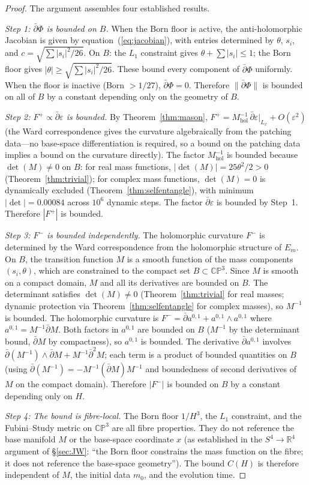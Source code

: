 \documentclass[11pt,a4paper]{article}
\theoremstyle{definition}
\theoremstyle{remark}
\newcommand{\CP}{\mathbb{CP}}
\newcommand{\R}{\mathbb{R}}
\newcommand{\dbar}{\bar{\partial}}
\begin{document}
\begin{proof}
The argument assembles four established results.

\emph{Step 1: $\dbar\Phi$ is bounded on $B$.} When the Born floor is active, the anti-holomorphic Jacobian is given by equation~(\ref{eq:jacobian}), with entries determined by $\theta$, $s_i$, and $c=\sqrt{\sum|s_i|^2/26}$. On $B$: the $L_1$ constraint gives $\theta+\sum|s_i|\leq 1$; the Born floor gives $|\theta|\geq\sqrt{\sum|s_i|^2/26}$. These bound every component of $\dbar\Phi$ uniformly. When the floor is inactive (Born $>1/27$), $\dbar\Phi=0$. Therefore $\|\dbar\Phi\|$ is bounded on all of $B$ by a constant depending only on the geometry of $B$.

\emph{Step 2: $F^+\propto\dbar\varepsilon$ is bounded.} By Theorem~\ref{thm:mason}, $F^+=M_{\mathrm{hol}}^{-1}\,\dbar\varepsilon|_{L_x}+O(\varepsilon^2)$ (the Ward correspondence gives the curvature algebraically from the patching data---no base-space differentiation is required, so a bound on the patching data implies a bound on the curvature directly). The factor $M_{\mathrm{hol}}^{-1}$ is bounded because $\det(M)\neq 0$ on $B$: for real mass functions, $|\det(M)|=25\theta^2/2>0$ (Theorem~\ref{thm:trivial}); for complex mass functions, $\det(M)=0$ is dynamically excluded (Theorem~\ref{thm:selfentangle}), with minimum $|\det|=0.00084$ across $10^6$ dynamic steps. The factor $\dbar\varepsilon$ is bounded by Step~1. Therefore $|F^+|$ is bounded.

\emph{Step 3: $F^-$ is bounded independently.} The holomorphic curvature $F^-$ is determined by the Ward correspondence from the holomorphic structure of $E_m$. On $B$, the transition function $M$ is a smooth function of the mass components $(s_i,\theta)$, which are constrained to the compact set $B\subset\CP^3$. Since $M$ is smooth on a compact domain, $M$ and all its derivatives are bounded on $B$. The determinant satisfies $\det(M)\neq 0$ (Theorem~\ref{thm:trivial} for real masses; dynamic protection via Theorem~\ref{thm:selfentangle} for complex masses), so $M^{-1}$ is bounded. The holomorphic curvature is $F^-=\dbar a^{0,1}+a^{0,1}\wedge a^{0,1}$ where $a^{0,1}=M^{-1}\dbar M$. Both factors in $a^{0,1}$ are bounded on $B$ ($M^{-1}$ by the determinant bound, $\dbar M$ by compactness), so $a^{0,1}$ is bounded. The derivative $\dbar a^{0,1}$ involves $\dbar(M^{-1})\wedge\dbar M+M^{-1}\dbar^2 M$; each term is a product of bounded quantities on $B$ (using $\dbar(M^{-1})=-M^{-1}(\dbar M)M^{-1}$ and boundedness of second derivatives of $M$ on the compact domain). Therefore $|F^-|$ is bounded on $B$ by a constant depending only on $H$.

\emph{Step 4: The bound is fibre-local.} The Born floor $1/H^3$, the $L_1$ constraint, and the Fubini--Study metric on $\CP^3$ are all fibre properties. They do not reference the base manifold $M$ or the base-space coordinate $x$ (as established in the $S^4\to\R^4$ argument of \S\ref{sec:JW}: ``the Born floor constrains the mass function on the fibre; it does not reference the base-space geometry''). The bound $C(H)$ is therefore independent of $M$, the initial data $m_0$, and the evolution time.
\end{proof}
\end{document}

